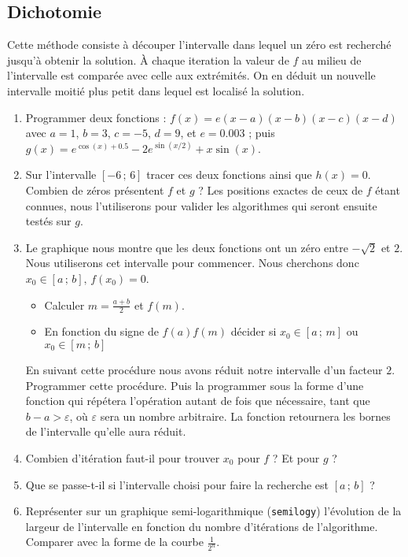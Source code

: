 \subsection{Dichotomie}
Cette méthode consiste à découper l'intervalle dans lequel 
un zéro est recherché jusqu'à obtenir la solution. À chaque iteration
la valeur de $f$ au milieu de l'intervalle est comparée avec celle aux extrémités. On en déduit un nouvelle intervalle moitié plus petit dans lequel est localisé la solution. 
\begin{enumerate}
\item Programmer deux fonctions : 
$f(x) = e(x-a)(x-b)(x-c)(x-d)$ avec $a=1$, $b=3$, $c=-5$, $d=9$, et $e=0.003$ ;
puis $g(x) = e^{\cos (x) + 0.5} - 2 e^{\sin(x/2)}+x\sin(x)$.
\item Sur l'intervalle $[-6\,;\,6]$ tracer ces deux fonctions ainsi 
que $h(x)=0$. Combien de zéros présentent $f$ et $g$ ? Les positions exactes 
de ceux de $f$ étant connues, nous l'utiliserons pour valider les algorithmes 
qui seront ensuite testés sur $g$. 
\item Le graphique nous montre que les deux fonctions ont un zéro entre $-\sqrt{2}$ et $2$. Nous utiliserons cet intervalle pour commencer. Nous cherchons donc $x_0 \in [a\,;\,b], \, f(x_0)=0$. 
\begin{itemize}
\item Calculer $m=\frac{a+b}{2}$ et $f(m)$.
\item En fonction du signe de $f(a)f(m)$ décider si   $x_0 \in [a\,;\,m]$  ou  $x_0 \in [m\,;\,b]$
\end{itemize}
 En suivant cette procédure nous avons réduit notre intervalle d'un facteur $2$. 
Programmer cette procédure. Puis la programmer sous la forme 
d'une fonction qui répétera l'opération autant de fois que nécessaire, tant que $b-a > \varepsilon $, où $\varepsilon$ sera un nombre arbitraire. La fonction retournera
les bornes de l'intervalle qu'elle aura réduit. 
\item Combien d'itération faut-il pour trouver $x_0$ pour $f$ ? Et pour $g$ ? 
\item Que se passe-t-il si l'intervalle choisi pour faire la recherche est 
 $[a\,;\,b]$ ?
\item Représenter sur un graphique semi-logarithmique ({\tt semilogy}) 
l'évolution de la largeur de l'intervalle
en fonction du nombre d'itérations de l'algorithme. Comparer avec la forme
de la courbe $\frac{1}{2^n}$. 
\end{enumerate} 
